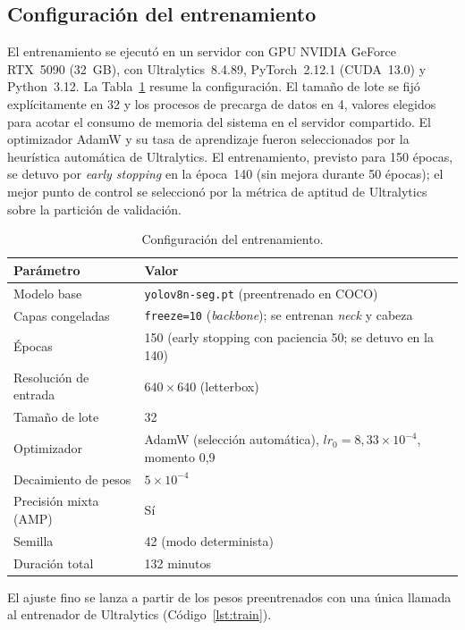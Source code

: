 \documentclass[11pt,a4paper]{article}
\begin{document}
\subsection{Configuración del entrenamiento}
\label{sec:config}

El entrenamiento se ejecutó en un servidor con GPU NVIDIA GeForce RTX~5090
(32~GB), con Ultralytics~8.4.89, PyTorch~2.12.1 (CUDA~13.0) y Python~3.12. La
Tabla~\ref{tab:config} resume la configuración. El tamaño de lote se fijó
explícitamente en 32 y los procesos de precarga de datos en 4, valores
elegidos para acotar el consumo de memoria del sistema en el servidor
compartido. El optimizador AdamW \cite{loshchilov2019adamw} y su tasa de
aprendizaje fueron seleccionados por la heurística automática de Ultralytics.
El entrenamiento, previsto para 150 épocas, se detuvo por \emph{early stopping}
en la época~140 (sin mejora durante 50 épocas); el mejor punto de control se
seleccionó por la métrica de aptitud de Ultralytics sobre la partición de
validación.

\begin{table}[H]
  \centering
  \small
  \caption{Configuración del entrenamiento.}
  \label{tab:config}
  \begin{tabular}{@{}ll@{}}
    \toprule
    \textbf{Parámetro} & \textbf{Valor} \\
    \midrule
    Modelo base & \texttt{yolov8n-seg.pt} (preentrenado en COCO) \\
    Capas congeladas & \texttt{freeze=10} (\emph{backbone}); se entrenan \emph{neck} y cabeza \\
    Épocas & 150 (early stopping con paciencia 50; se detuvo en la 140) \\
    Resolución de entrada & $640\times640$ (letterbox) \\
    Tamaño de lote & 32 \\
    Optimizador & AdamW (selección automática), $lr_0 = 8{,}33\times10^{-4}$,
    momento 0,9 \\
    Decaimiento de pesos & $5\times10^{-4}$ \\
    Precisión mixta (AMP) & Sí \\
    Semilla & 42 (modo determinista) \\
    Duración total & 132 minutos \\
    \bottomrule
  \end{tabular}
\end{table}

El ajuste fino se lanza a partir de los pesos preentrenados con una única
llamada al entrenador de Ultralytics (Código~\ref{lst:train}).
\end{document}

